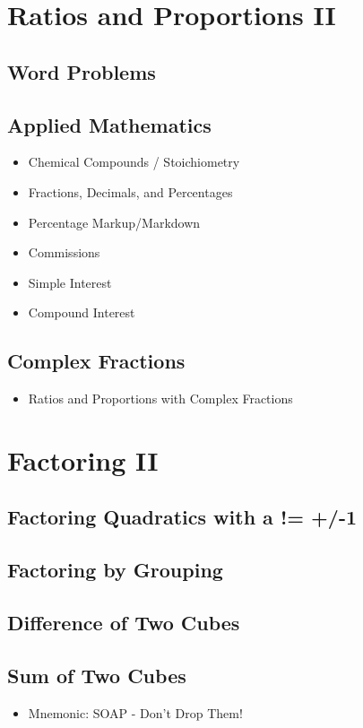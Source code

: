 \documentclass[11pt]{article}
\begin{document}
\setcounter{section}{8}
\section{Ratios and Proportions II}
\subsection{Word Problems}
\subsection{Applied Mathematics}
\begin{itemize}
    \item Chemical Compounds / Stoichiometry
    \item Fractions, Decimals, and Percentages
    \item Percentage Markup/Markdown
    \item Commissions
    \item Simple Interest
    \item Compound Interest
\end{itemize}
\subsection{Complex Fractions}
\begin{itemize}
    \item Ratios and Proportions with Complex Fractions
\end{itemize}

\setcounter{section}{9}
\section{Factoring II}
\subsection{Factoring Quadratics with a != +/-1}
\subsection{Factoring by Grouping}
\subsection{Difference of Two Cubes}
\subsection{Sum of Two Cubes}
\begin{itemize}
    \item Mnemonic: SOAP - Don't Drop Them!
\end{itemize}
\end{document}
